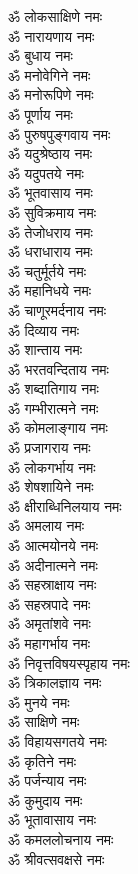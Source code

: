 \begin{multicols}{2}
\begin{flushleft}
ॐ लोकसाक्षिणे नमः\\
ॐ नारायणाय नमः\\
ॐ बुधाय नमः\\
ॐ मनोवेगिने नमः\\
ॐ मनोरूपिणे नमः\\
ॐ पूर्णाय नमः\hfill{}\\
ॐ पुरुषपुङ्गवाय नमः\\
ॐ यदुश्रेष्ठाय नमः\\
ॐ यदुपतये नमः\\
ॐ भूतवासाय नमः\\
ॐ सुविक्रमाय नमः\\
ॐ तेजोधराय नमः\\
ॐ धराधाराय नमः\\
ॐ चतुर्मूर्तये नमः\\
ॐ महानिधये नमः\\
ॐ चाणूरमर्दनाय नमः\hfill{}\\
ॐ दिव्याय नमः\\
ॐ शान्ताय नमः\\
ॐ भरतवन्दिताय नमः\\
ॐ शब्दातिगाय नमः\\
ॐ गम्भीरात्मने नमः\\
ॐ कोमलाङ्गाय नमः\\
ॐ प्रजागराय नमः\\
ॐ लोकगर्भाय नमः\\
ॐ शेषशायिने नमः\\
ॐ क्षीराब्धिनिलयाय नमः\hfill{}\\
ॐ अमलाय नमः\\
ॐ आत्मयोनये नमः\\
ॐ अदीनात्मने नमः\\
ॐ सहस्राक्षाय नमः\\
ॐ सहस्रपादे नमः\\
ॐ अमृतांशवे नमः\\
ॐ महागर्भाय नमः\\
ॐ निवृत्तविषयस्पृहाय नमः\\
ॐ त्रिकालज्ञाय नमः\\
ॐ मुनये नमः\hfill{}\\
ॐ साक्षिणे नमः\\
ॐ विहायसगतये नमः\\
ॐ कृतिने नमः\\
ॐ पर्जन्याय नमः\\
ॐ कुमुदाय नमः\\
ॐ भूतावासाय नमः\\
ॐ कमललोचनाय नमः\\
ॐ श्रीवत्सवक्षसे नमः\\

\end{flushleft}
\end{multicols}
